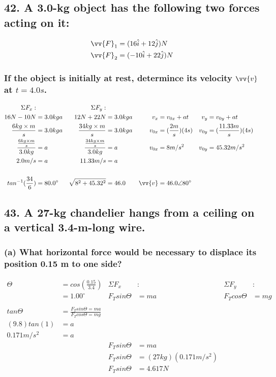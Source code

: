 \documentclass[12pt,a4paper,english]{article}
\begin{document}
\begin{flushleft}
  \subsection{42. A 3.0-kg object has the following two forces acting on it:}
  \begin{align*}
    \vv{F}_1&=(16\hat{i}+12\hat{j})N\\
    \vv{F}_2&=(-10\hat{i}+22\hat{j})N
  \end{align*}
  \subsubsection{If the object is initially at rest, determince its velocity $\vv{v}$ at $t=4.0s$.}
  \begin{align*}
    \Sigma F_x:&  &   \Sigma F_y:&\\
    16N-10N&=3.0kga 
       & 12N+22N&=3.0kga
       &v_x&=v_{0x}+at
       &v_y&=v_{0y}+at
       \\
    \frac{6kg\times m}{s}&=3.0kga
       &\frac{34kg\times m}{s}&=3.0kga
       &v_{0x}&=(\frac{2m}{s})(4s)
       &v_{0y}&=(\frac{11.33m}{s})(4s)
       \\
    \frac{\frac{6kg\times m}{s}}{3.0kg}&=a
       &\frac{\frac{34kg\times m}{s}}{3.0kg}&=a
       &v_{0x}&=8m/s^2
       &v_{0y}&=45.32m/s^2
       \\
    2.0m/s&=a
       &11.33m/s&=a
       \\
       \\
    tan^{-1}(\frac{34}{6})&=80.0^\circ 
       &\sqrt{8^2+45.32^2}&=46.0
       &\vv{v}&=46.0\angle 80^\circ
  \end{align*}
  \subsection{43. A 27-kg chandelier hangs from a ceiling on a vertical 3.4-m-long wire.}
  \subsubsection{(a) What horizontal force would be necessary to displace its position 0.15 m to one side?}
  \begin{align*}
    \Theta&=cos(\frac{0.15}{3.4})
      &\Sigma F_x&:
      &\Sigma F_y&:
    \\
    &=1.00^\circ
      &F_Tsin\Theta&=ma
      &F_Tcos\Theta&=mg
    \\
    \\
    tan\Theta&=\frac{F_Tsin\Theta=ma}{F_Tcos\Theta=mg}
    \\
    (9.8)tan(1)&=a
    \\
    0.171m/s^2&=a
    \\
      &&F_Tsin\Theta&=ma
      \\
      &&F_Tsin\Theta&=(27kg)(0.171m/s^2)
      \\
      &&F_Tsin\Theta&=4.617N
      \\
  \end{align*}

\end{flushleft}
\end{document}
